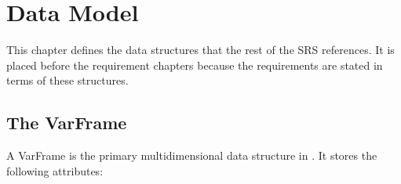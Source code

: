
\chapter{Data Model}
\label{ch:datamodel}

This chapter defines the data structures that the rest of the SRS
references. It is placed before the requirement chapters because the
requirements are stated in terms of these structures.

\section{The VarFrame}
\label{sec:varframe}

A VarFrame is the primary multidimensional data structure in \itc{}. It
stores the following attributes:

